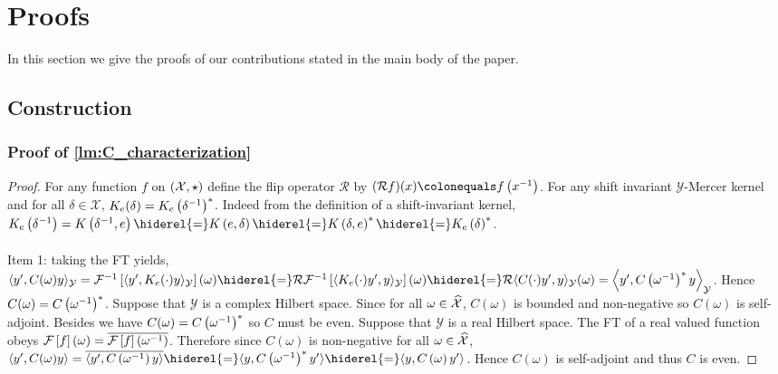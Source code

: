 
\section{Proofs}
In this section we give the proofs of our contributions stated in the main body
of the paper.
\subsection{Construction}
\subsubsection{Proof of \texorpdfstring{\cref{lm:C_characterization}}{Lemma %
\ref{lm:C_characterization}}}
\begin{proof}
    For any function $f$ on $(\mathcal{X},\star)$ define the flip operator
    $\mathcal{R}$ by $(\mathcal{R}f)(x) \colonequals f\left(\inv{x}\right)$.
    For any shift invariant $\mathcal{Y}$-Mercer kernel and for all
    $\delta\in\mathcal{X}$,
    $K_e(\delta)=K_e\left({\delta}^{-1}\right)^*$. Indeed from the
    definition of a shift-invariant kernel,
    $K_e\left(\inv{\delta}\right)=K\left(\inv{\delta},e\right)
    \hiderel{=}K\left(e,\delta\right)
    \hiderel{=}K\left(\delta,e\right)^\adjoint
    \hiderel{=}K_e\left(\delta\right)^\adjoint$.
    \paragraph{}
    Item 1: taking the \acl{FT} yields,
    $\inner{y',C(\omega)y}_{\mathcal{Y}}=\IFT{\inner{y',
    K_e(\cdot)y}_{\mathcal{Y}}}(\omega)
    \hiderel{=}\mathcal{R}\IFT{\inner{K_e(\cdot)y', y}_{\mathcal{Y}}}(\omega)
    \hiderel{=}\mathcal{R}\inner{C(\cdot)y',y}_{\mathcal{Y}}(\omega)
    =\inner*{y',C\left(\inv{\omega}\right)^\adjoint y}_{\mathcal{Y}}$.  Hence
    $C(\omega)=C\left({\omega}^{-1}\right)^*$. Suppose that $\mathcal{Y}$
    is a complex Hilbert space. Since for all $\omega\in\mathcal{\widehat{X}}$,
    $C(\omega)$ is bounded and non-negative so $C(\omega)$ is self-adjoint.
    Besides we have $C(\omega)=C\left({\omega}^{-1}\right)^* $ so $C$
    must be even.  Suppose that $\mathcal{Y}$ is a real Hilbert space. The
    \acl{FT} of a real valued function obeys
    $\mathcal{F}\left[f\right](\omega)=\overline{\mathcal{F}\left[f\right]\left({\omega}^{-1}\right)}$. Therefore since
    $C(\omega)$ is non-negative for all $\omega\in\widehat{\mathcal{X}}$,
    $\inner{y', C(\omega)y} = \conj{\inner{y', C\left(\inv{\omega}\right)y}}
    \hiderel{=}\inner{y, C\left(\inv{\omega}\right)^* y'} \hiderel{=}\inner{y,
    C\left(\omega\right) y'}$.  Hence $C(\omega)$ is self-adjoint and thus $C$
    is even.

\end{proof}
